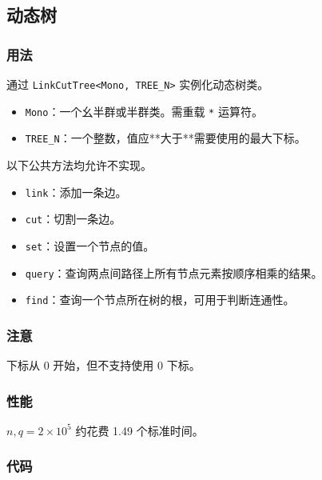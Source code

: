 \subsection{动态树}

\subsubsection{用法}

通过 \lstinline{LinkCutTree<Mono, TREE_N>} 实例化动态树类。

\begin{itemize}
\item \lstinline{Mono}：一个幺半群或半群类。需重载 \lstinline{*} 运算符。
\item \lstinline{TREE_N}：一个整数，值应**大于**需要使用的最大下标。
\end{itemize}

以下公共方法均允许不实现。

\begin{itemize}
\item \lstinline{link}：添加一条边。
\item \lstinline{cut}：切割一条边。
\item \lstinline{set}：设置一个节点的值。
\item \lstinline{query}：查询两点间路径上所有节点元素按顺序相乘的结果。
\item \lstinline{find}：查询一个节点所在树的根，可用于判断连通性。
\end{itemize}

\subsubsection{注意}

下标从 0 开始，但不支持使用 0 下标。

\subsubsection{性能}

$n, q = 2\times 10^5$ 约花费 1.49 个标准时间。

\subsubsection{代码}


